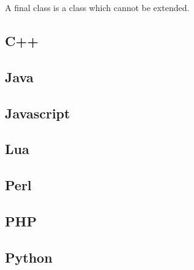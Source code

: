 \documentclass{KodeBook}
\begin{document}
A final class is a class which cannot be extended. 

\subsection{C++}


\subsection{Java}


\subsection{Javascript} 


\subsection{Lua}


\subsection{Perl}


\subsection{PHP}


\subsection{Python}
\end{document}
